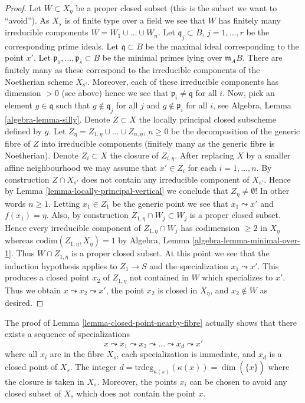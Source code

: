 \begin{proof}
\medskip\noindent
Let $W \subset X_\eta$ be a proper closed subset (this is the
subset we want to ``avoid''). As $X_s$ is of finite type over a field
we see that $W$ has finitely many irreducible components
$W = W_1 \cup \ldots \cup W_n$. Let
$\mathfrak q_j \subset B$, $j = 1, \ldots, r$
be the corresponding prime ideals. Let $\mathfrak q \subset B$
be the maximal ideal corresponding to the point $x'$.
Let $\mathfrak p_1, \ldots, \mathfrak p_s \subset B$ be the
minimal primes lying over $\mathfrak m_AB$. There are finitely
many as these correspond to the irreducible components of the
Noetherian scheme $X_{s'}$. Moreover, each of these irreducible
components has dimension $> 0$ (see above) hence we see that
$\mathfrak p_i \not = \mathfrak q$ for all $i$.
Now, pick an element $g \in \mathfrak q$ such that
$g \not \in \mathfrak q_j$ for all $j$ and $g \not \in \mathfrak p_i$
for all $i$, see
Algebra, Lemma \ref{algebra-lemma-silly}.
Denote $Z \subset X$ the locally principal closed subscheme defined by $g$.
Let $Z_\eta = Z_{1, \eta} \cup \ldots \cup Z_{n, \eta}$, $n \geq 0$
be the decomposition of the generic fibre of $Z$ into irreducible
components (finitely many as the generic fibre is Noetherian).
Denote $Z_i \subset X$ the closure of $Z_{i, \eta}$.
After replacing $X$ by a smaller affine neighbourhood
we may assume that $x' \in Z_i$ for each $i = 1, \ldots, n$.
By construction $Z \cap X_{s'}$ does not contain any irreducible
component of $X_{s'}$. Hence by
Lemma \ref{lemma-locally-principal-vertical}
we conclude that $Z_\eta \not = \emptyset$! In other words
$n \geq 1$. Letting $x_1 \in Z_1$ be the generic point we see
that $x_1 \leadsto x'$ and $f(x_1) = \eta$.
Also, by construction $Z_{1, \eta} \cap W_j \subset W_j$
is a proper closed subset. Hence every irreducible component of
$Z_{1, \eta} \cap W_j$ has codimension $\geq 2$ in $X_\eta$
whereas $\text{codim}(Z_{1, \eta}, X_\eta) = 1$ by
Algebra, Lemma \ref{algebra-lemma-minimal-over-1}.
Thus $W \cap Z_{1, \eta}$ is a proper closed subset.
At this point we see that the induction hypothesis applies to
$Z_1 \to S$ and the specialization $x_1 \leadsto x'$.
This produces a closed point $x_2$ of $Z_{1, \eta}$ not contained
in $W$ which specializes to $x'$. Thus we obtain
$x \leadsto x_2 \leadsto x'$, the point $x_2$ is closed in $X_\eta$,
and $x_2 \not \in W$ as desired.
\end{proof}

\begin{remark}
\label{remark-full-specialization-sequence}
The proof of
Lemma \ref{lemma-closed-point-nearby-fibre}
actually shows that there exists a sequence of specializations
$$
x \leadsto x_1 \leadsto x_2 \leadsto \ldots \leadsto x_d \leadsto x'
$$
where all $x_i$ are in the fibre $X_s$, each specialization is
immediate, and $x_d$ is a closed point of $X_s$. The integer
$d = \text{trdeg}_{\kappa(s)}(\kappa(x)) = \dim(\overline{\{x\}})$
where the closure is taken in $X_s$. Moreover, the points
$x_i$ can be chosen to avoid any closed subset of $X_s$ which
does not contain the point $x$.
\end{remark}

